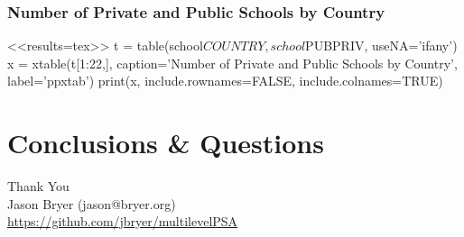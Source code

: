 \documentclass[10pt,slidestop,mathserif]{beamer}
\begin{document}
\begin{frame}
	\frametitle{Number of Private and Public Schools by Country}
<<results=tex>>
t = table(school$COUNTRY, school$PUBPRIV, useNA='ifany')
x = xtable(t[1:22,], caption='Number of Private and Public Schools by Country', label='ppxtab')
print(x, include.rownames=FALSE, include.colnames=TRUE)

\end{frame}

\begin{frame}
	\frametitle{}
\end{frame}

\begin{frame}
	\frametitle{}
\end{frame}

\begin{frame}
	\frametitle{}
\end{frame}


\begin{frame}
	\frametitle{}
\end{frame}

{ %
    \begin{frame}[plain]
     \end{frame}
}



\section{Conclusions \& Questions}
\begin{frame}[c]
	\LARGE{Thank You}\\
	\normalsize
	Jason Bryer (jason@bryer.org)\\
	\url{https://github.com/jbryer/multilevelPSA}
\end{frame}
\end{document}

